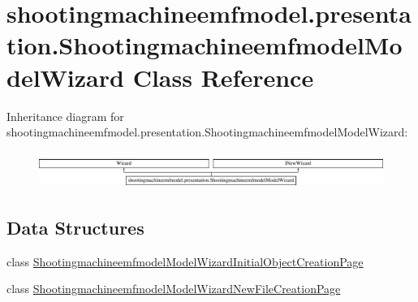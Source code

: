 \hypertarget{classshootingmachineemfmodel_1_1presentation_1_1_shootingmachineemfmodel_model_wizard}{\section{shootingmachineemfmodel.\-presentation.\-Shootingmachineemfmodel\-Model\-Wizard Class Reference}
\label{classshootingmachineemfmodel_1_1presentation_1_1_shootingmachineemfmodel_model_wizard}
}
Inheritance diagram for shootingmachineemfmodel.\-presentation.\-Shootingmachineemfmodel\-Model\-Wizard\-:\begin{figure}[H]
\begin{center}
\leavevmode
\includegraphics[height=1.199143cm]{classshootingmachineemfmodel_1_1presentation_1_1_shootingmachineemfmodel_model_wizard}
\end{center}
\end{figure}
\subsection*{Data Structures}
\begin{DoxyCompactItemize}
\item 
class \hyperlink{classshootingmachineemfmodel_1_1presentation_1_1_shootingmachineemfmodel_model_wizard_1_1_shootia3fbc6bd8d9af3fefbb57f601e613dce}{Shootingmachineemfmodel\-Model\-Wizard\-Initial\-Object\-Creation\-Page}
\item 
class \hyperlink{classshootingmachineemfmodel_1_1presentation_1_1_shootingmachineemfmodel_model_wizard_1_1_shooti0374ed52aef5c158aa4d43d4797c2d9f}{Shootingmachineemfmodel\-Model\-Wizard\-New\-File\-Creation\-Page}
\end{DoxyCompactItemize}
